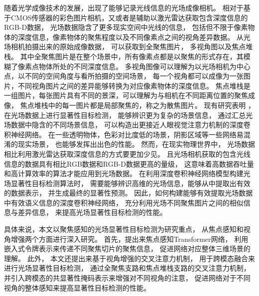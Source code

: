 随着光学成像技术的发展，出现了能够记录光线信息的光场成像相机。
相对于基于CMOS传感器的彩色图片相机，又或者是辅助以激光雷达获取包含深度信息的RGB-D数据，
光场数据隐含了更多现实空间中光线的信息，
包括但不限于像素物体的深度信息，像素物体的聚焦程度以及不同像素点之间的视角差异数据。
从光场相机拍摄出来的原始成像数据，
可以获取到全聚焦图片，
多视角图以及焦点堆栈。
其中全聚焦图片是在整个场景中，所有像素点都是以聚焦的形式存在，其模糊了像素点物体所处的不同深度信息。
多视角图像可以理解为以光场相机为中心点，以不同的空间角度与看所拍摄的空间场景，
每一个视角都可以成像为一张图片，不同视角图片之间的差异能够转换为对应像素物体的深度信息。
焦点堆栈是一组图片，每张图片具有不同的景深，可以理解为与相机在不同距离位置的聚焦成像，
焦点堆栈中的每一图片都是局部聚焦的，称之为散焦图片。
现有研究表明
，
在光场数据上进行显著性目标检测，
能够辨识更为复杂的场景信息，
通过汇总光场数据中隐含的不同场景信息，
可以构造出更接近人眼视觉注意力机制的深度卷积神经网络。
在一些透明物体，色彩对比度低的场景，阴影区域等一些网络易混淆的现实场景，
也能够发挥出出色的性能。
然而，在现实物理世界中，
光场数据相比利用激光雷达获取深度信息的方式要更加少见。
且光场相机获取的包含光线信息的数据具有相比RGB数据和RGB-D数据更高的量级，
这意味着高数据吞吐量和高计算效率的算法才能应用到光场数据。
在利用深度卷积神经网络模型构建光场显著性目标检测算法时，
需要能够辨识高维的光场信息，能够从中提取出有效的数据表示，
并生成最终的显著性预测。
因此，如何构建能够有效提取光场数据中有效语义信息的深度卷积神经网络，
充分利用光场不同聚焦图片之间的相似信息与差异信息，
来提高光场显著性目标检测的性能。






具体来说，本文以聚焦感知的光场显著性目标检测为研究重点，
从焦点感知和视角增强两个方面进行深入研究。
首先，提出来焦点感知Transformer网络，
利用嵌入式令牌表示来传递不同聚焦切片的聚焦信息，
促进网络对应整体三维场景的理解。
此外，
本文还提出来基于视角增强的交叉注意力机制，
用于跨模态融合来进行光场显著性目标检测，
通过全聚焦支路和焦点堆栈支路的交叉注意力机制，
并引入跨模态的共显著性掩码表示来增强对不同视角的注意，
促进网络对于不同视角的整体感知来提高显著性目标检测的性能。








